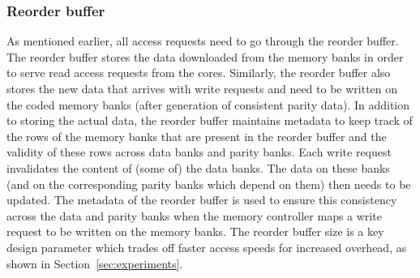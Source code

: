 \subsubsection{Reorder buffer}
\label{sec:reorder}

As mentioned earlier, all access requests need to go through the reorder buffer. The reorder buffer stores the data downloaded from the memory banks in order to serve read access requests from the cores. Similarly, the reorder buffer also stores the new data that arrives with write requests and need to be written on the coded memory banks (after generation of consistent parity data). In addition to storing the actual data, the reorder buffer maintains metadata to keep track of the rows of the memory banks that are present in the reorder buffer and the validity of these rows across data banks and parity banks. Each write request invalidates the content of (some of) the data banks. The data on these banks (and on the corresponding parity banks which depend on them) then needs to be updated. The metadata of the reorder buffer is used to ensure this consistency across the data and parity banks when the memory controller maps a write request to be written on the memory banks. The reorder buffer size is a key design parameter which trades off faster access speeds for increased overhead, as shown in Section~\ref{sec:experiments}.


